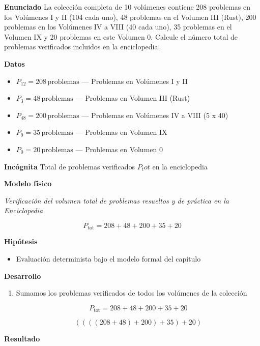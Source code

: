 \documentclass{book}
\begin{document}
\begin{tcolorbox}[title={Problema resuelto}, studiumworked, breakable]

\noindent\textbf{Enunciado}
La colección completa de 10 volúmenes contiene 208 problemas en los Volúmenes I y II (104 cada uno), 48 problemas en el Volumen III (Rust), 200 problemas en los Volúmenes IV a VIII (40 cada uno), 35 problemas en el Volumen IX y 20 problemas en este Volumen 0. Calcule el número total de problemas verificados incluidos en la enciclopedia.

\noindent\textbf{Datos}
\begin{itemize}
\item $P_{12} = 208\,\mathrm{problemas}$ — Problemas en Volúmenes I y II
\item $P_{3} = 48\,\mathrm{problemas}$ — Problemas en Volumen III (Rust)
\item $P_{48} = 200\,\mathrm{problemas}$ — Problemas en Volúmenes IV a VIII (5 x 40)
\item $P_{9} = 35\,\mathrm{problemas}$ — Problemas en Volumen IX
\item $P_{0} = 20\,\mathrm{problemas}$ — Problemas en Volumen 0
\end{itemize}

\noindent\textbf{Incógnita}
Total de problemas verificados \(P_tot\) en la enciclopedia

\noindent\textbf{Modelo físico}

\noindent\textit{Verificación del volumen total de problemas resueltos y de práctica en la Enciclopedia}

\[
P_{\text{tot}} = 208 + 48 + 200 + 35 + 20
\]

\noindent\textbf{Hipótesis}
\begin{itemize}
\item Evaluación determinista bajo el modelo formal del capítulo
\end{itemize}

\noindent\textbf{Desarrollo}
\begin{enumerate}
\item
Sumamos los problemas verificados de todos los volúmenes de la colección

\[
P_{\text{tot}} = 208 + 48 + 200 + 35 + 20
\]

\[
\left(\left(\left(\left(208+48\right)+200\right)+35\right)+20\right)
\]
\end{enumerate}

\noindent\textbf{Resultado}


\end{tcolorbox}
\end{document}
